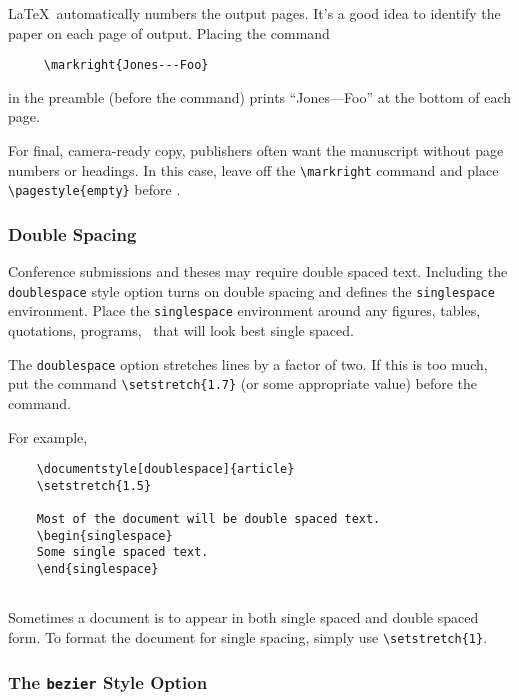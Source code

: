 \LaTeX\ automatically numbers the output pages.  It's a good idea 
to identify the paper on each page of output.  Placing the command
\begin{verbatim}
     \markright{Jones---Foo}
\end{verbatim}
in the preamble (before the \hbox{\verb||} command)
prints ``Jones---Foo'' at the bottom of each page.  

For final, camera-ready copy, publishers often want the manuscript
without page numbers or headings.
In this case, leave off the \verb|\markright| command
and place \verb|\pagestyle{empty}| before \verb||.

\subsubsection{Double Spacing}

Conference submissions and theses may require double spaced text.
Including the {\tt doublespace} style option
turns on double spacing and defines the {\tt singlespace} environment.
Place the {\tt singlespace} environment around any
figures, tables, quotations, programs, \etc\ that will look best single spaced.

The {\tt doublespace} option stretches lines by a factor of two.
If this is too much, put the command \verb|\setstretch{1.7}|
(or some appropriate value) before the \verb|| command.

For example,
\begin{verbatim}
    \documentstyle[doublespace]{article}
    \setstretch{1.5}
    
    Most of the document will be double spaced text.
    \begin{singlespace}
    Some single spaced text.
    \end{singlespace}
    
\end{verbatim}

Sometimes a document is to appear in both single spaced and double spaced form.
To format the document for single spacing, simply use \verb|\setstretch{1}|.

\subsubsection{The {\tt bezier} Style Option}

